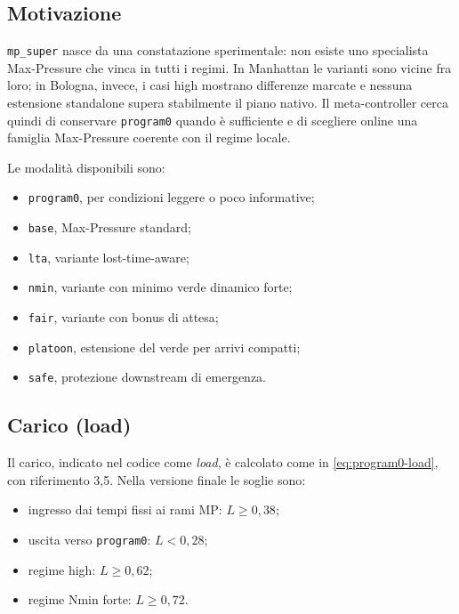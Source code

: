 \documentclass[12pt,a4paper,oneside]{report}
\numberwithin{equation}{chapter}
\begin{document}
\subsection{Motivazione}

\texttt{mp\_super} nasce da una constatazione sperimentale: non esiste uno
specialista Max-Pressure che vinca in tutti i regimi. In Manhattan le varianti
sono vicine fra loro; in Bologna, invece, i casi high mostrano differenze
marcate e nessuna estensione standalone supera stabilmente il piano nativo. Il
meta-controller cerca quindi di conservare \texttt{program0} quando è
sufficiente e di scegliere online una famiglia Max-Pressure coerente con il
regime locale.

Le modalità disponibili sono:

\begin{itemize}
    \item \texttt{program0}, per condizioni leggere o poco informative;
    \item \texttt{base}, Max-Pressure standard;
    \item \texttt{lta}, variante lost-time-aware;
    \item \texttt{nmin}, variante con minimo verde dinamico forte;
    \item \texttt{fair}, variante con bonus di attesa;
    \item \texttt{platoon}, estensione del verde per arrivi compatti;
    \item \texttt{safe}, protezione downstream di emergenza.
\end{itemize}

\subsection{Carico (load)}

Il carico, indicato nel codice come \emph{load}, è calcolato come in
\cref{eq:program0-load}, con riferimento 3,5. Nella versione finale le soglie
sono:

\begin{itemize}
    \item ingresso dai tempi fissi ai rami MP: \(L\geq 0{,}38\);
    \item uscita verso \texttt{program0}: \(L<0{,}28\);
    \item regime high: \(L\geq 0{,}62\);
    \item regime Nmin forte: \(L\geq 0{,}72\).
\end{itemize}
\end{document}
